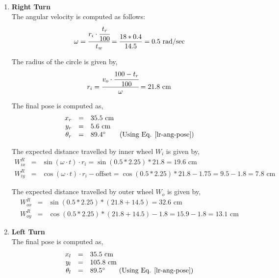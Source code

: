 \begin{enumerate}
\item \textbf{Right Turn} \\
The angular velocity is computed as follows:
	\begin{equation}
	\omega = \cfrac{r_i \cdot \cfrac{t_r}{100}}{t_w} = \frac{18 * 0.4}{14.5} = 0.5 \text{ rad/sec}
	\end{equation}
	
	The radius of the circle is given by,
	\begin{equation}
	r_i = \cfrac{v_o \cdot \cfrac{100 - t_r}{100}}{\omega} = 21.8 \text{ cm}
	\label{radius-circle}
	\end{equation}
	
	The final pose is computed as,
	\begin{equation}
	\begin{array}{rcl}
	x_r &=& 35.5 \text{ cm} \\
	y_r &=& 5.6 \text{ cm} \\
	\theta_r &=& 89.4^{\circ} \qquad \text{(Using Eq. \ref{lr-ang-pose})}
	\end{array}
	\end{equation}
	
	The expected distance travelled by inner wheel $W_i$ is given by,
	\begin{equation}
	\begin{array}{rcl}
	W^R_{ix} &=& \sin(\omega \cdot t) \cdot r_i = \sin(0.5 * 2.25) * 21.8 = 19.6 \text{ cm} \\
	W^R_{iy} &=& \cos(\omega \cdot t) \cdot r_i - \text{offset} =  \cos(0.5 * 2.25) * 21.8 - 1.75 = 9.5 - 1.8 = 7.8 \text{ cm}
	\end{array}
	\end{equation}
	
	The expected distance travelled by outer wheel $W_o$ is given by,
	\begin{equation}
	\begin{array}{rcl}
	W^R_{ox} &=& \sin(0.5 * 2.25) * (21.8 + 14.5) = 32.6 \text{ cm} \\
	W^R_{oy} &=& \cos(0.5 * 2.25) * (21.8 + 14.5) - 1.8 = 15.9 - 1.8 = 13.1 \text{ cm}
	\end{array}
	\end{equation}
	
	\item \textbf{Left Turn} \\
	The final pose is computed as,
	\begin{equation}
	\begin{array}{rcl}
	x_l &=& 35.5 \text{ cm} \\
	y_l &=& 105.8 \text{ cm} \\
	\theta_l &=& 89.5^{\circ} \qquad \text{(Using Eq. \ref{lr-ang-pose})}
	\end{array}
	\end{equation}
		

\end{enumerate}
